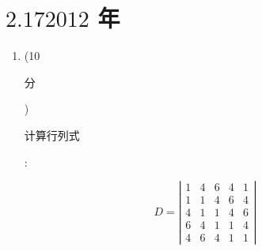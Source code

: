 \documentclass[10pt]{article}
\begin{document}
\section{$2.172012$ 年}
\begin{enumerate}
  \item (10 \begin{CJK}{UTF8}{mj}分\end{CJK}) \begin{CJK}{UTF8}{mj}计算行列式\end{CJK}:
\end{enumerate}
$$
D=\left|\begin{array}{lllll}
1 & 4 & 6 & 4 & 1 \\
1 & 1 & 4 & 6 & 4 \\
4 & 1 & 1 & 4 & 6 \\
6 & 4 & 1 & 1 & 4 \\
4 & 6 & 4 & 1 & 1
\end{array}\right|
$$
\end{document}
